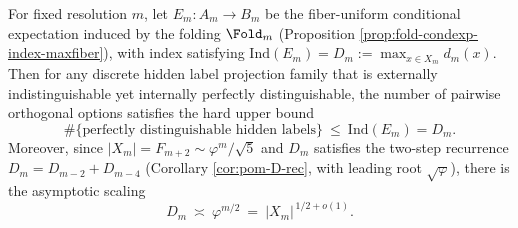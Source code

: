 \begin{corollary}\label{cor:dephys-fold-hidden-label-cap-sqrt}
For fixed resolution \(m\), let \(E_m:A_m\to B_m\) be the fiber-uniform conditional expectation induced by the folding \(\Fold_m\) (Proposition \ref{prop:fold-condexp-index-maxfiber}), with index satisfying
\(\mathrm{Ind}(E_m)=D_m:=\max_{x\in X_m}d_m(x)\).
Then for any discrete hidden label projection family that is externally indistinguishable yet internally perfectly distinguishable, the number of pairwise orthogonal options satisfies the hard upper bound
\[
\#\{\text{perfectly distinguishable hidden labels}\}\ \le\ \mathrm{Ind}(E_m)=D_m.
\]
Moreover, since \(|X_m|=F_{m+2}\sim \varphi^{m}/\sqrt5\) and \(D_m\) satisfies the two-step recurrence \(D_m=D_{m-2}+D_{m-4}\) (Corollary \ref{cor:pom-D-rec}, with leading root \(\sqrt{\varphi}\)), there is the asymptotic scaling
\[
D_m\ \asymp\ \varphi^{m/2}\ =\ |X_m|^{\,1/2+o(1)}.
\]
\end{corollary}

